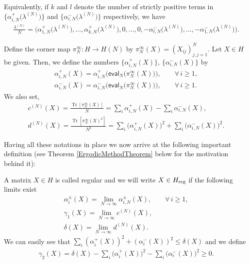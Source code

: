 \documentclass[pdftex]{sigma}
\numberwithin{equation}{section}
\begin{document}
Equivalently, if $k$ and $l$ denote the number of strictly positive terms in $\big\{\alpha_{i,N}^+\big(\lambda^{(N)}\big) \big\}$ and $ \big\{\alpha_{i,N}^-\big(\lambda^{(N)}\big) \big\}$ respectively, we have
\begin{gather*}
\frac{\lambda^{(N)}}{N}=\big(\alpha_{1,N}^+\big(\lambda^{(N)}\big),\dots,\alpha_{k,N}^+\big(\lambda^{(N)}\big),0, \dots, 0, -\alpha_{l,N}^-\big(\lambda^{(N)}\big),\dots,-\alpha_{1,N}^-\big(\lambda^{(N)}\big)\big).
\end{gather*}

 Define the corner map $\pi_N^{\infty}\colon H \to H(N)$ by $\pi_N^{\infty}(X)=(X_{ij})^N_{j,j=1}$. Let $X\in H$ be given. Then, we define the numbers $\big\{\alpha_{i,N}^+(X) \big\}$, $\big\{\alpha_{i,N}^-(X) \big\}$ by
\begin{gather*}
\alpha_{i,N}^+(X)=\alpha_{i,N}^+\big(\mathsf{eval}_N\big(\pi_N^{\infty}(X)\big)\big), \qquad \forall\, i \ge 1,\\
\alpha_{i,N}^-(X)=\alpha_{i,N}^-\big(\mathsf{eval}_N\big(\pi_N^{\infty}(X)\big)\big), \qquad \forall\, i \ge 1.
\end{gather*}
We also set,
\begin{gather*}
c^{(N)}(X) =\frac{\operatorname{Tr}[\pi_N^{\infty}(X)]}{N}=\sum_{i}^{}\alpha_{i,N}^+(X) -\sum_{i}^{}\alpha_{i,N}^-(X),\\
d^{(N)}(X) =\frac{\operatorname{Tr}[\pi_N^{\infty}(X)^2]}{N^2}=\sum_{i}^{}\big(\alpha_{i,N}^+(X)\big)^2+\sum_{i}^{}\big(\alpha_{i,N}^-(X)\big)^2 .
\end{gather*}

Having all these notations in place we now arrive at the following important definition (see Theorem \ref{ErgodicMethodTheorem} below for the motivation behind it):

\begin{Definition}A matrix $X \in H$ is called regular and we will write $X \in H_{{\rm reg}}$ if the following limits exist
\begin{gather*}
\alpha_i^{\pm}(X) =\lim_{N \to \infty}\alpha_{i,N}^{\pm}(X), \qquad \forall\, i \ge 1,\\
\gamma_1(X) =\lim_{N \to \infty}c^{(N)}(X),\\
\delta(X) =\lim_{N \to \infty}d^{(N)}(X).
\end{gather*}
We can easily see that $\sum_{i}^{} (\alpha_{i}^+(X) )^2+ (\alpha_{i}^-(X) )^2 \le \delta(X)$ and we define
\begin{gather*}
\gamma_2(X)=\delta(X)-\sum_{i}^{}\big(\alpha_{i}^+(X)\big)^2-\sum_{i}^{}\big(\alpha_{i}^-(X)\big)^2\ge 0.
\end{gather*}
\end{Definition}
\end{document}
